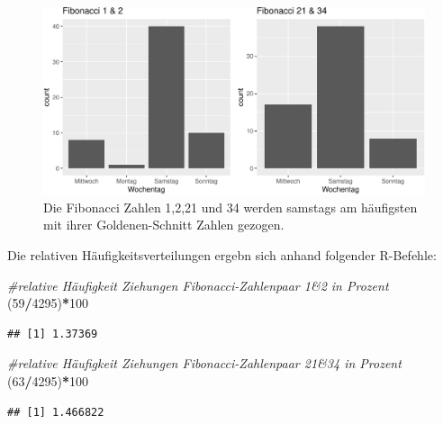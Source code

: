 \documentclass[ngerman,]{article}
\newenvironment{Shaded}{\begin{snugshade}}{\end{snugshade}}
\newcommand{\DecValTok}[1]{\textcolor[rgb]{0.00,0.00,0.81}{#1}}
\newcommand{\CommentTok}[1]{\textcolor[rgb]{0.56,0.35,0.01}{\textit{#1}}}
\newcommand{\OperatorTok}[1]{\textcolor[rgb]{0.81,0.36,0.00}{\textbf{#1}}}
\newcommand{\NormalTok}[1]{#1}
\begin{document}
\begin{figure}

\includegraphics{Abbildung/unnamed-chunk-3-1} \hfill{}

\caption{Die Fibonacci Zahlen 1,2,21 und 34 werden samstags am häufigsten mit ihrer Goldenen-Schnitt Zahlen gezogen.}\label{fig:unnamed-chunk-3}
\end{figure}

\newline
Die relativen Häufigkeitsverteilungen ergebn sich anhand folgender
R-Befehle:

\begin{Shaded}
\begin{Highlighting}[]
\CommentTok{#relative Häufigkeit Ziehungen Fibonacci-Zahlenpaar 1&2 in Prozent}
\NormalTok{(}\DecValTok{59}\OperatorTok{/}\DecValTok{4295}\NormalTok{)}\OperatorTok{*}\DecValTok{100}
\end{Highlighting}
\end{Shaded}

\begin{verbatim}
## [1] 1.37369
\end{verbatim}

\begin{Shaded}
\begin{Highlighting}[]
\CommentTok{#relative Häufigkeit Ziehungen Fibonacci-Zahlenpaar 21&34 in Prozent}
\NormalTok{(}\DecValTok{63}\OperatorTok{/}\DecValTok{4295}\NormalTok{)}\OperatorTok{*}\DecValTok{100}
\end{Highlighting}
\end{Shaded}

\begin{verbatim}
## [1] 1.466822
\end{verbatim}
\end{document}
